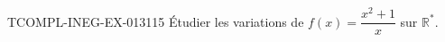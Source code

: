 \begin{exercice}{TCOMPL-INEG-EX-013}{1}{15}
Étudier les variations de $f(x) = \dfrac{x^2+1}{x}$ sur $\mathbb{R}^*$.

\end{exercice}
